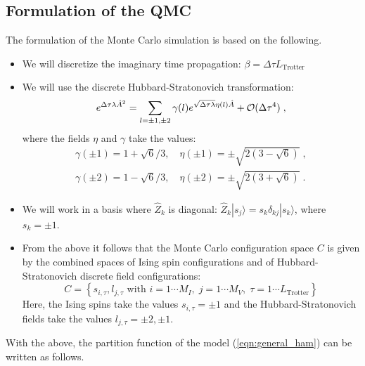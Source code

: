 \subsection{Formulation of the QMC}  
The formulation of the  Monte Carlo simulation is based on the following.
\begin{itemize}
\item  We will discretize the imaginary time propagation: $\beta = \Delta \tau L_{\text{Trotter}} $
\item  We will use  the   discrete Hubbard-Stratonovich transformation:
\begin{equation}
\label{HS_squares}
        e^{\Delta \tau  \lambda  \hat{A}^2 } =
        \sum_{ l = \pm 1, \pm 2}  \gamma(l)
e^{ \sqrt{\Delta \tau \lambda }
       \eta(l)  \hat{A} }
                + {\cal O} (\Delta \tau ^4)\;,
\end{equation}
where the fields $\eta$ and $\gamma$ take the values:
\begin{eqnarray}
 \gamma(\pm 1)  = 1 + \sqrt{6}/3, \quad  \eta(\pm 1 ) = \pm \sqrt{2 \left(3 - \sqrt{6} \right)}\;,\\\nonumber
  \gamma(\pm 2) = 1 - \sqrt{6}/3, \quad  \eta(\pm 2 ) = \pm \sqrt{2 \left(3 + \sqrt{6} \right)}\;.
\nonumber
\end{eqnarray}
\item  We will work in  a basis  where  $\hat{Z}_k$ is diagonal: $\hat{Z}_{k}|s_{j}\rangle = s_{k}\delta_{kj}|s_{k}\rangle$, where $s_{k}=\pm 1$.
\item From the above it follows that the  Monte Carlo configuration space $C$  
is given by the combined spaces of Ising spin configurations  and of Hubbard-Stratonovich discrete field configurations:
\begin{equation}
	C = \left\{   s_{i,\tau} ,  l_{j,\tau}  \text{ with }  i=1\cdots M_I,\;  j = 1\cdots M_V,\; \tau=1\cdots L_{\mathrm{Trotter}}  \right\}
\end{equation}
Here, the Ising spins take the values  $s_{i,\tau} = \pm 1$ and  the Hubbard-Stratonovich fields take the values  $l_{j,\tau}  = \pm 2, \pm 1 $.
\end{itemize}
With the above, the partition function of the model (\ref{eqn:general_ham}) can be written as follows.

